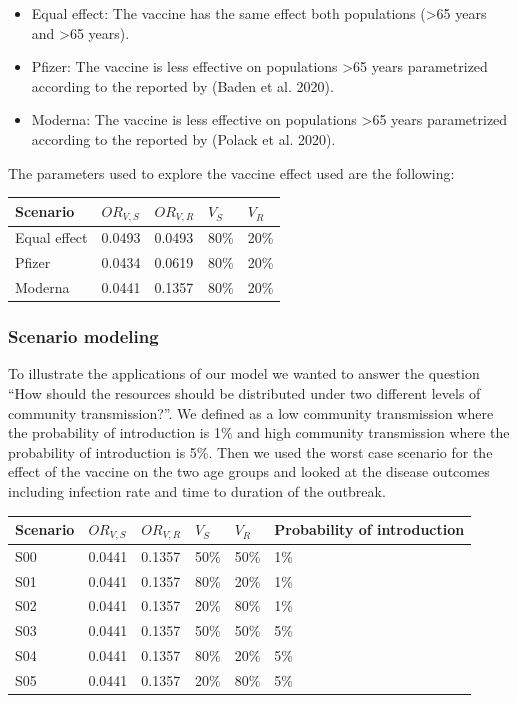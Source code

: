 \documentclass[
]{article}
\providecommand{\tightlist}{%
  \setlength{\itemsep}{0pt}\setlength{\parskip}{0pt}}
\begin{document}
\begin{itemize}
\tightlist
\item
  Equal effect: The vaccine has the same effect both populations
  (\textgreater65 years and \textgreater65 years).\\
\item
  Pfizer: The vaccine is less effective on populations \textgreater65
  years parametrized according to the reported by (Baden et al. 2020).\\
\item
  Moderna: The vaccine is less effective on populations \textgreater65
  years parametrized according to the reported by (Polack et al. 2020).
\end{itemize}

The parameters used to explore the vaccine effect used are the
following:

\begin{longtable}[]{@{}lllll@{}}
\toprule
Scenario & \(OR_{V,S}\) & \(OR_{V,R}\) & \(V_S\) &
\(V_R\)\tabularnewline
\midrule
\endhead
Equal effect & 0.0493 & 0.0493 & 80\% & 20\%\tabularnewline
Pfizer & 0.0434 & 0.0619 & 80\% & 20\%\tabularnewline
Moderna & 0.0441 & 0.1357 & 80\% & 20\%\tabularnewline
\bottomrule
\end{longtable}

\hypertarget{scenario-modeling}{%
\subsubsection{Scenario modeling}\label{scenario-modeling}}

To illustrate the applications of our model we wanted to answer the
question ``How should the resources should be distributed under two
different levels of community transmission?''. We defined as a low
community transmission where the probability of introduction is 1\% and
high community transmission where the probability of introduction is
5\%. Then we used the worst case scenario for the effect of the vaccine
on the two age groups and looked at the disease outcomes including
infection rate and time to duration of the outbreak.

\begin{longtable}[]{@{}llllll@{}}
\toprule
Scenario & \(OR_{V,S}\) & \(OR_{V,R}\) & \(V_S\) & \(V_R\) & Probability
of introduction\tabularnewline
\midrule
\endhead
S00 & 0.0441 & 0.1357 & 50\% & 50\% & 1\%\tabularnewline
S01 & 0.0441 & 0.1357 & 80\% & 20\% & 1\%\tabularnewline
S02 & 0.0441 & 0.1357 & 20\% & 80\% & 1\%\tabularnewline
S03 & 0.0441 & 0.1357 & 50\% & 50\% & 5\%\tabularnewline
S04 & 0.0441 & 0.1357 & 80\% & 20\% & 5\%\tabularnewline
S05 & 0.0441 & 0.1357 & 20\% & 80\% & 5\%\tabularnewline
\bottomrule
\end{longtable}
\end{document}
